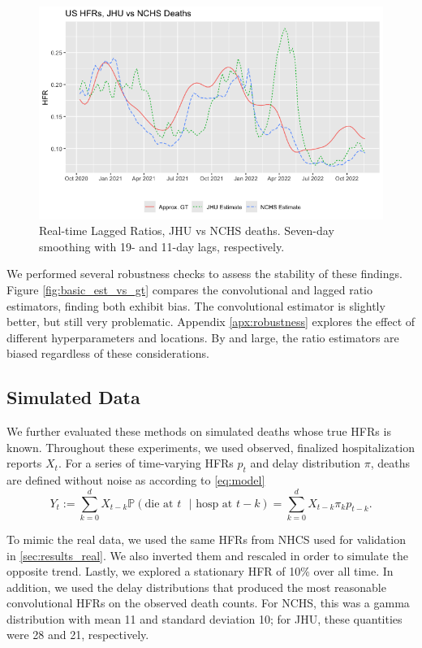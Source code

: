 \documentclass{article}
\begin{document}
\begin{figure}
    \centering
    \includegraphics[width=0.7\linewidth]{Figs/jhu_vs_nchs.png}
    \caption{Real-time Lagged Ratios, JHU vs NCHS deaths. Seven-day smoothing with 19- and 11-day lags, respectively.}
    \label{fig:jhu_vs_nchs}
\end{figure}

We performed several robustness checks to assess the stability of these findings. Figure \ref{fig:basic_est_vs_gt} compares the convolutional and lagged ratio estimators, finding both exhibit bias. The convolutional estimator is slightly better, but still very problematic. Appendix \ref{apx:robustness} explores the effect of different hyperparameters and locations. By and large, the ratio estimators are biased regardless of these considerations. 

\subsection{Simulated Data}

We further evaluated these methods on simulated deaths whose true HFRs is known. Throughout these experiments, we used observed, finalized hospitalization reports $X_t$. For a series of time-varying HFRs $p_t$ and delay distribution $\pi$, deaths are defined without noise as according to \ref{eq:model}
$$Y_t := \sum_{k=0}^d X_{t-k} \mathbb{P}(\text{die at $t$ }\vert\text{ hosp at }t-k) = \sum_{k=0}^d X_{t-k} \pi_k p_{t-k}.$$

To mimic the real data, we used the same HFRs from NHCS used for validation in \ref{sec:results_real}. We also inverted them and rescaled in order to simulate the opposite trend. Lastly, we explored a stationary HFR of 10\% over all time. In addition, we used the delay distributions that produced the most reasonable convolutional HFRs on the observed death counts. For NCHS, this was a gamma distribution with mean 11 and standard deviation 10; for JHU, these quantities were 28 and 21, respectively. 
\end{document}
